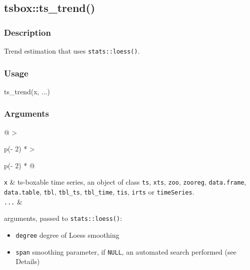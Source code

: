 \documentclass[
  letterpaper,
  DIV=11,
  numbers=noendperiod]{scrreport}
\newenvironment{Shaded}{\begin{snugshade}}{\end{snugshade}}
\newcommand{\FunctionTok}[1]{\textcolor[rgb]{0.28,0.35,0.67}{#1}}
\newcommand{\NormalTok}[1]{\textcolor[rgb]{0.00,0.23,0.31}{#1}}
\begin{document}
\subsection{tsbox::ts\_trend()}\label{tsboxts_trend}

\subsubsection{Description}\label{description-33}

Trend estimation that uses \texttt{stats::loess()}.

\subsubsection{Usage}\label{usage-33}

\begin{Shaded}
\begin{Highlighting}[]
\FunctionTok{ts\_trend}\NormalTok{(x, ...)}
\end{Highlighting}
\end{Shaded}

\subsubsection{Arguments}\label{arguments-33}

\begin{longtable}[]{@{}
  >{\raggedright\arraybackslash}p{(\columnwidth - 2\tabcolsep) * }
  >{\raggedright\arraybackslash}p{(\columnwidth - 2\tabcolsep) * }@{}}
\toprule\noalign{}
\endhead
\bottomrule\noalign{}
\endlastfoot
\texttt{x} & ts-boxable time series, an object of class \texttt{ts},
\texttt{xts}, \texttt{zoo}, \texttt{zooreg}, \texttt{data.frame},
\texttt{data.table}, \texttt{tbl}, \texttt{tbl\_ts}, \texttt{tbl\_time},
\texttt{tis}, \texttt{irts} or \texttt{timeSeries}. \\
\texttt{...} & \begin{minipage}[t]{\linewidth}\raggedright
arguments, passed to \texttt{stats::loess()}:

\begin{itemize}
\item
  \texttt{degree} degree of Loess smoothing
\item
  \texttt{span} smoothing parameter, if \texttt{NULL}, an automated
  search performed (see Details)
\end{itemize}
\end{minipage} \\
\end{longtable}
\end{document}
